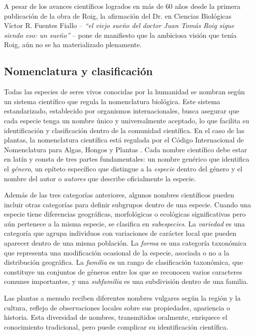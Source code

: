 A pesar de los avances científicos logrados en más de 60 años desde la primera publicación 
de la obra de Roig, la afirmación del Dr. en Ciencias Biológicas Víctor R. Fuentes Fiallo 
-- \textit{``el viejo sueño del doctor Juan Tomás Roig sigue siendo eso: un sueño''} -- \cite{Fiallo2009} 
pone de manifiesto que la ambiciosa visión que tenía Roig, aún no se ha materializado plenamente.


\subsection{Nomenclatura y clasificación}
Todas las especies de seres vivos conocidas por la humanidad se nombran según un 
sistema científico que regula la nomenclatura biológica. Este sistema estandarizado, 
establecido por organismos internacionales, busca asegurar que cada especie tenga 
un nombre único y universalmente aceptado, lo que facilita su identificación y 
clasificación dentro de la comunidad científica. En el caso de las plantas, 
la nomenclatura científica está regulada por el Código Internacional de Nomenclatura 
para Algas, Hongos y Plantas \cite{Mcneil2012}. Cada nombre científico debe estar en latín 
y consta de tres partes fundamentales: un nombre genérico que identifica el \textit{género}, 
un epíteto específico que distingue a la \textit{especie} dentro del género y el 
nombre del autor o \textit{autores} que describe oficialmente la especie.

Además de las tres categorías anteriores, algunos nombres científicos pueden incluir 
otras categorías para definir subgrupos dentro de una especie. Cuando una especie 
tiene diferencias geográficas, morfológicas o ecológicas significativas pero aún 
pertenece a la misma especie, se clasifica en \textit{subespecies}. 
La \textit{variedad} es una categoría que agrupa individuos con variaciones de 
carácter local que pueden aparecer dentro de una misma población. 
La \textit{forma} es una categoría taxonómica que representa una 
modificación ocasional de la especie, asociada o no a la distribución geográfica.
La \textit{familia} es un rango de clasificación taxonómica, que constituye un conjuntos 
de géneros entre los que se reconocen varios caracteres comunes importantes, 
y una \textit{subfamilia} es una subdivisión dentro de una familia. \cite{Romero2017}

Las plantas a menudo reciben diferentes nombres vulgares según la región y la 
cultura, reflejo de observaciones locales sobre sus propiedades, apariencia o 
historia. Esta diversidad de nombres, transmitidos oralmente, enriquece el 
conocimiento tradicional, pero puede complicar su identificación científica.



